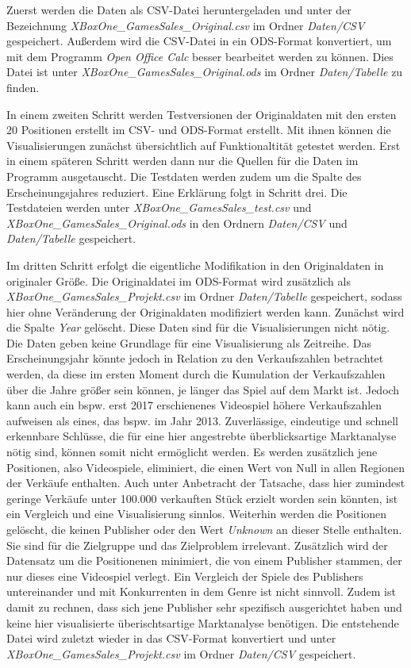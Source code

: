\documentclass[usegeometry=true]{scrartcl}
\begin{document}
Zuerst werden die Daten als CSV-Datei heruntergeladen und unter der Bezeichnung \textit{XBoxOne_GamesSales_Original.csv} im Ordner \textit{Daten/CSV} gespeichert. 
Außerdem wird die CSV-Datei in ein ODS-Format konvertiert, um mit dem Programm \textit{Open Office Calc} besser bearbeitet werden zu können. Dies Datei ist unter \textit{XBoxOne_GamesSales_Original.ods} im Ordner \textit{Daten/Tabelle} zu finden. 

In einem zweiten Schritt werden Testversionen der Originaldaten mit den ersten 20 Positionen erstellt im CSV- und ODS-Format erstellt. Mit ihnen können die Visualisierungen zunächst übersichtlich auf Funktionaltität getestet werden. 
Erst in einem späteren Schritt werden dann nur die Quellen für die Daten im Programm ausgetauscht. Die Testdaten werden zudem um die Spalte des Erscheinungsjahres reduziert. Eine Erklärung folgt in Schritt drei.
Die Testdateien werden unter \textit{XBoxOne_GamesSales_test.csv} und \textit{XBoxOne_GamesSales_Original.ods} in den Ordnern \textit{Daten/CSV} und \textit{Daten/Tabelle} gespeichert.

Im dritten Schritt erfolgt die eigentliche Modifikation in den Originaldaten in originaler Größe. Die Originaldatei im ODS-Format wird zusätzlich als \textit{XBoxOne_GamesSales_Projekt.csv} im Ordner \textit{Daten/Tabelle} gespeichert, sodass hier ohne Veränderung der Originaldaten modifiziert werden kann.
Zunächst wird die Spalte  \textit{Year} gelöscht. Diese Daten sind für die Visualisierungen nicht nötig. Die Daten geben keine Grundlage für eine Visualisierung als Zeitreihe. 
Das Erscheinungsjahr könnte jedoch in Relation zu den Verkaufszahlen betrachtet werden, da diese im ersten Moment durch die Kumulation der Verkaufszahlen über die Jahre größer sein können, je länger das Spiel auf dem Markt ist. 
Jedoch kann auch ein bspw. erst 2017 erschienenes Videospiel höhere Verkaufszahlen aufweisen als eines, das bspw. im Jahr 2013. Zuverlässige, eindeutige und schnell erkennbare Schlüsse, die für eine hier angestrebte überblicksartige Marktanalyse nötig sind, können somit nicht ermöglicht werden. 
Es werden zusätzlich jene Positionen, also Videospiele, eliminiert, die einen Wert von Null in allen Regionen der Verkäufe enthalten. 
Auch unter Anbetracht der Tatsache, dass hier zumindest geringe Verkäufe unter 100.000 verkauften Stück erzielt worden sein könnten, ist ein Vergleich und eine Visualisierung sinnlos.
Weiterhin werden die Positionen gelöscht, die keinen Publisher oder den Wert  \textit{Unknown} an dieser Stelle enthalten. Sie sind für die Zielgruppe und das Zielproblem irrelevant.
Zusätzlich wird der Datensatz um die Positionenen minimiert, die von einem Publisher stammen, der nur dieses eine Videospiel verlegt. Ein Vergleich der Spiele des Publishers untereinander und mit Konkurrenten in dem Genre ist nicht sinnvoll. 
Zudem ist damit zu rechnen, dass sich jene Publisher sehr spezifisch ausgerichtet haben und keine hier visualisierte überischtsartige Marktanalyse benötigen.
Die entstehende Datei wird zuletzt wieder in das CSV-Format konvertiert und unter \textit{XBoxOne_GamesSales_Projekt.csv} im Ordner \textit{Daten/CSV} gespeichert.
\end{document}
